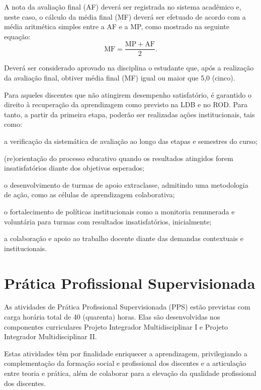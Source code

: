 \documentclass[
	12pt,				%
	openright,			%
	twoside,			%
	a4paper,			%
	chapter=TITLE,		%
	english,			%
	french,				%
	spanish,			%
	brazil,				%
	]{abntex2}
\begin{document}
A nota da avaliação final (AF) deverá ser registrada no sistema acadêmico e, neste caso, o cálculo da média final (MF) deverá ser efetuado de acordo com a média aritmética simples entre a AF e a MP, como mostrado na seguinte equação:
\[
    \mathrm{MF} = \frac{ \mathrm{MP} + \mathrm{AF}}{2}.
\]

Deverá ser considerado aprovado na disciplina o estudante que, após a realização da avaliação final, obtiver média final (MF) igual ou maior que 5,0 (cinco).

Para aqueles discentes que não atingirem desempenho satisfatório, é garantido o direito à recuperação da aprendizagem como previsto na LDB e no ROD. Para tanto, a partir da primeira etapa, poderão ser realizadas ações institucionais, tais como:
\begin{alineas}
	\item a verificação da sistemática de avaliação ao longo das etapas e semestres do curso;
 	\item (re)orientação do processo educativo quando os resultados atingidos forem insatisfatórios diante dos objetivos esperados;
 	\item o desenvolvimento de turmas de apoio extraclasse, admitindo uma metodologia de ação, como as células de aprendizagem colaborativa;
 	\item o fortalecimento de políticas institucionais como a monitoria remunerada e voluntária para turmas com resultados insatisfatórios, inicialmente;
 	\item a colaboração e apoio ao trabalho docente diante das demandas contextuais e institucionais.
\end{alineas}



\section{Pr\'atica Profissional Supervisionada}
As atividades de Prática Profissional Supervisionada (PPS) estão previstas
com carga horária total de 40 (quarenta) horas. Elas são desenvolvidas nos
componentes curriculares Projeto Integrador Multidisciplinar I e Projeto Integrador
Multidisciplinar II.

Estas atividades têm por finalidade enriquecer a aprendizagem, privilegiando a
complementação da formação social e profissional dos discentes e a articulação
entre teoria e prática, além de colaborar para a elevação da qualidade
profissional dos discentes.
\end{document}
